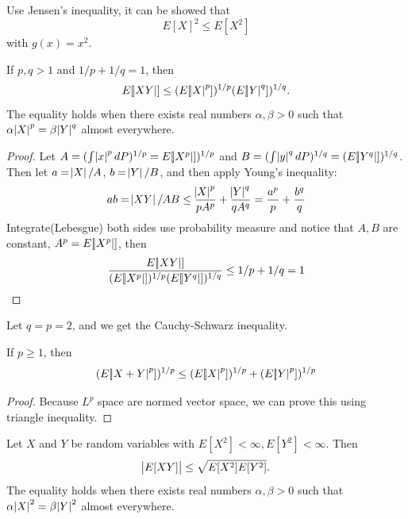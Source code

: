 \begin{refsection}
\begin{example}
	Use Jensen's inequality, it can be showed that
	$$E[X]^2 \leq E[X^2]$$ with $g(x) = x^2$.
\end{example}




\begin{theorem} 
\cite[319]{grimmett2001probability}\label{ch:theory-of-probability:th:HolderInequality}
If $p,q > 1$ and $1/p + 1/q = 1$, then
$$E[\abs{XY}] \leq (E[\abs{X}^p])^{1/p}(E[\abs{Y}^q])^{1/q}.$$
The equality holds when there exists real numbers $\alpha,\beta >0$ such that $\alpha \abs{X}^p = \beta \abs{Y}^q$  almost everywhere.
\end{theorem}
\begin{proof}
Let $A = (\int \abs{x}^pdP)^{1/p} = E[\abs{X^p}])^{1/p} $ and $B = (\int \abs{y}^qdP)^{1/q}=(E[\abs{Y^q}])^{1/q}$. Then let $a = \abs{X}/A$, $b = \abs{Y}/B$, and then apply Young's inequality:
$$ab = \abs{XY}/AB \leq \frac{\abs{X}^p}{pA^p} + \frac{\abs{Y}^q}{qA^q} = \frac{a^p}{p} + \frac{b^q}{q}$$
Integrate(Lebesgue) both sides use probability measure and notice that $A,B$ are constant, $A^p = E[\abs{X^p}]$, then
$$\frac{E[\abs{XY}]}{(E[\abs{X^p}])^{1/p}(E[\abs{Y^q}])^{1/q}} \leq 1/p+1/q =1$$	
\end{proof}

\begin{remark}
Let $q=p=2$, and we get the Cauchy-Schwarz inequality.
\end{remark}



\begin{theorem}
\cite[319]{grimmett2001probability}
If $p \geq 1$, then
$$(E[\abs{X+Y}^p])^{1/p} \leq (E[\abs{X}^p])^{1/p} + (E[\abs{Y}^p])^{1/p}$$
\end{theorem}
\begin{proof}
Because $L^p$ space are normed vector space, we can prove this using triangle inequality.	
\end{proof}

\begin{theorem}\cite{rosenthal2006first}\cite[187]{casella2002statistical}\label{ch:theory-of-probability:th:Cauchy-SchwarzInequality}
	Let $X$ and $Y$ be random variables with $E[X^2] < \infty, E[Y^2]<\infty$. Then $$\abs{E[XY]}\leq \sqrt{E[X^2]E[Y^2]}.$$
	The equality holds when there exists real numbers $\alpha,\beta >0$ such that $\alpha \abs{X}^2 = \beta \abs{Y}^2$ almost everywhere.
	

\end{theorem}
\end{refsection}
